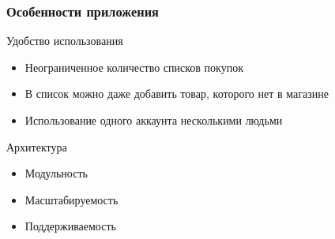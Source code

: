 \documentclass{beamer}
\begin{document}
\begin{frame}
\frametitle{Особенности приложения}
	\begin{multicols}{2}
        Удобство использования
        \bigskip
        \begin{itemize}
            \item Неограниченное количество списков покупок
            \item В список можно даже добавить товар, которого нет в магазине
            \item Использование одного аккаунта несколькими людьми
        \end{itemize}
	\columnbreak
        Архитектура
        \bigskip
	\begin{itemize}
		\item Модульность
		\item Масштабируемость
		\item Поддерживаемость
	\end{itemize}
	\end{multicols}
\end{frame}
\end{document}
